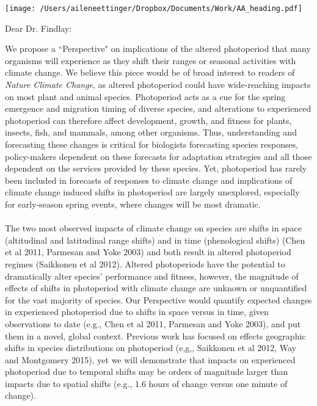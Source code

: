 \documentclass[11pt,a4paper]{letter}
\begin{document}

\begin{letter}{}
\texttt{[image: /Users/aileneettinger/Dropbox/Documents/Work/AA\_heading.pdf]}

\opening{Dear Dr. Findlay:}
We propose a ``Perspective" on implications of the altered photoperiod that many organisms will experience as they shift their ranges or seasonal activities with climate change. 
We believe this piece would be of broad interest to readers of \emph{Nature Climate Change}, as altered photoperiod could have wide-reaching impacts on most plant and animal species. Photoperiod acts as a cue for the spring emergence and migration timing of diverse species, and alterations to experienced photoperiod can therefore affect development, growth, and fitness for plants, insects, fish, and mammals, among other organisms. Thus, understanding and forecasting these changes is critical for biologists forecasting species responses, policy-makers dependent on these forecasts for adaptation strategies and all those dependent on the services provided by these species. Yet, photoperiod has rarely been included in forecasts of responses to climate change and implications of climate change induced shifts in photoperiod are largely unexplored, especially for early-season spring events, where changes will be most dramatic. 
\\
\\
The two most observed impacts of climate change on species are shifts in space (altitudinal and latitudinal range shifts) and in time (phenological shifts) (Chen et al 2011, Parmesan and Yoke 2003) and both result in altered photoperiod regimes (Saikkonen et al 2012).  Altered photoperiods have the potential to dramatically alter species' performance and fitness, however, the magnitude of effects of shifts in photoperiod with climate change are unknown or unquantified for the vast majority of species.  Our Perspective would quantify expected changes in experienced photoperiod due to shifts in space versus in time, given observations to date (e.g., Chen et al 2011, Parmesan and Yoke 2003), and put them in a novel, global context. Previous work has focused on effects geographic shifts in species distributions on photoperiod (e,g,, Saikkonen et al 2012, Way and Montgomery 2015), yet we will demonstrate that impacts on experienced photoperiod due to temporal shifts may be orders of magnitude larger than impacts due to spatial shifts (e.g., 1.6 hours of change versus one minute of change). %

\end{letter}
\end{document}
